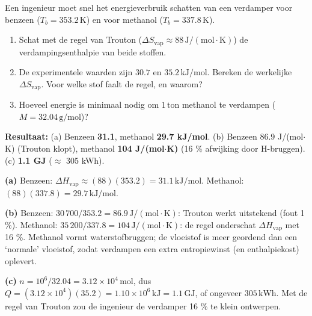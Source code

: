 \begin{oefening}
Een ingenieur moet snel het energieverbruik schatten van een verdamper voor benzeen (\(T_b = 353.2\,\mathrm{K}\)) en voor methanol (\(T_b = 337.8\,\mathrm{K}\)).

\begin{enumerate}
\item[(a)]
  Schat met de regel van Trouton (\(\Delta S_{\text{vap}} \approx 88\,\mathrm{J/(mol\cdot K)}\)) de verdampingsenthalpie van beide stoffen.
\item[(b)]
  De experimentele waarden zijn \(30.7\) en \(35.2\,\mathrm{kJ/mol}\). Bereken de werkelijke \(\Delta S_{\text{vap}}\). Voor welke stof faalt de regel, en waarom?
\item[(c)]
  Hoeveel energie is minimaal nodig om \(1\,\mathrm{ton}\) methanol te verdampen (\(M = 32.04\,\mathrm{g/mol}\))?
\end{enumerate}
\end{oefening}
\begin{oplossing}
\textbf{Resultaat:} (a) Benzeen \textbf{31.1}, methanol \textbf{29.7 kJ/mol}. (b) Benzeen 86.9 J/(mol\ensuremath{\cdot{}}K) (Trouton klopt), methanol \textbf{104 J/(mol\ensuremath{\cdot{}}K)} (16 \% afwijking door H-bruggen). (c) \textbf{1.1 GJ} (\ensuremath{\approx{}} 305 kWh).

\textbf{(a)} Benzeen: \(\Delta H_{\text{vap}} \approx (88)(353.2) = 31.1\,\mathrm{kJ/mol}\). Methanol: \((88)(337.8) = 29.7\,\mathrm{kJ/mol}\).

\textbf{(b)} Benzeen: \(30\,700/353.2 = 86.9\,\mathrm{J/(mol\cdot K)}\): Trouton werkt uitstekend (fout 1 \%). Methanol: \(35\,200/337.8 = 104\,\mathrm{J/(mol\cdot K)}\): de regel onderschat \(\Delta H_{\text{vap}}\) met 16 \%. Methanol vormt waterstofbruggen; de vloeistof is meer geordend dan een `normale' vloeistof, zodat verdampen een extra entropiewinst (en enthalpiekost) oplevert.

\textbf{(c)} \(n = 10^6/32.04 = 3.12\times10^4\,\mathrm{mol}\), dus \(Q = (3.12\times10^4)(35.2) = 1.10\times10^{6}\,\mathrm{kJ} = 1.1\,\mathrm{GJ}\), of ongeveer \(305\,\mathrm{kWh}\). Met de regel van Trouton zou de ingenieur de verdamper 16 \% te klein ontwerpen.
\end{oplossing}

